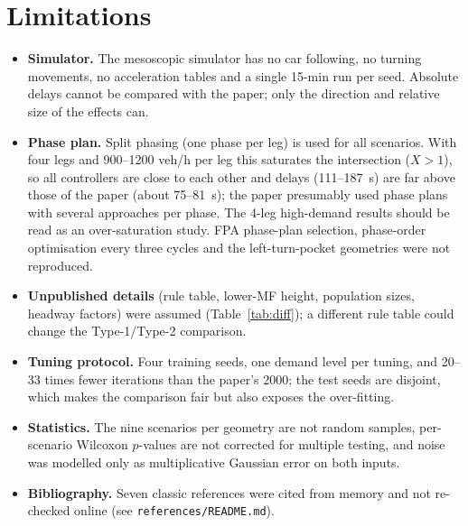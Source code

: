 \section{Limitations}
\begin{itemize}\setlength\itemsep{0pt}
\item \textbf{Simulator.} The mesoscopic simulator has no car following, no turning movements, no acceleration tables and a single 15-min run per seed. Absolute delays cannot be compared with the paper; only the direction and relative size of the effects can.
\item \textbf{Phase plan.} Split phasing (one phase per leg) is used for all scenarios. With four legs and 900--1200 veh/h per leg this saturates the intersection ($X>1$), so all controllers are close to each other and delays (111--187~s) are far above those of the paper (about 75--81~s); the paper presumably used phase plans with several approaches per phase. The 4-leg high-demand results should be read as an over-saturation study. FPA phase-plan selection, phase-order optimisation every three cycles and the left-turn-pocket geometries were not reproduced.
\item \textbf{Unpublished details} (rule table, lower-MF height, population sizes, headway factors) were assumed (Table~\ref{tab:diff}); a different rule table could change the Type-1/Type-2 comparison.
\item \textbf{Tuning protocol.} Four training seeds, one demand level per tuning, and 20--33 times fewer iterations than the paper's 2000; the test seeds are disjoint, which makes the comparison fair but also exposes the over-fitting.
\item \textbf{Statistics.} The nine scenarios per geometry are not random samples, per-scenario Wilcoxon $p$-values are not corrected for multiple testing, and noise was modelled only as multiplicative Gaussian error on both inputs.
\item \textbf{Bibliography.} Seven classic references were cited from memory and not re-checked online (see \texttt{references/}\allowbreak\texttt{README.md}).
\end{itemize}

